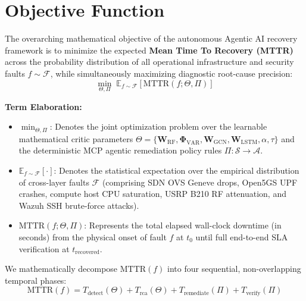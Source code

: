 \section{Objective Function}
The overarching mathematical objective of the autonomous Agentic AI recovery framework is to minimize the expected \textbf{Mean Time To Recovery (MTTR)} across the probability distribution of all operational infrastructure and security faults $f \sim \mathcal{F}$, while simultaneously maximizing diagnostic root-cause precision:
\begin{equation}
\min_{\Theta, \Pi} \; \mathbb{E}_{f \sim \mathcal{F}} \left[ \text{MTTR}(f; \Theta, \Pi) \right]
\label{eq:obj_main}
\end{equation}

\noindent\textbf{Term Elaboration:}
\begin{itemize}
    \item $\min_{\Theta, \Pi}$: Denotes the joint optimization problem over the learnable mathematical critic parameters $\Theta = \{ \mathbf{W}_{\text{RF}}, \mathbf{\Phi}_{\text{VAR}}, \mathbf{W}_{\text{GCN}}, \mathbf{W}_{\text{LSTM}}, \alpha, \tau \}$ and the deterministic MCP agentic remediation policy rules $\Pi : \mathcal{S} \to \mathcal{A}$.
    \item $\mathbb{E}_{f \sim \mathcal{F}}[\cdot]$: Denotes the statistical expectation over the empirical distribution of cross-layer faults $\mathcal{F}$ (comprising SDN OVS Geneve drops, Open5GS UPF crashes, compute host CPU saturation, USRP B210 RF attenuation, and Wazuh SSH brute-force attacks).
    \item $\text{MTTR}(f; \Theta, \Pi)$: Represents the total elapsed wall-clock downtime (in seconds) from the physical onset of fault $f$ at $t_0$ until full end-to-end SLA verification at $t_{\text{recovered}}$.
\end{itemize}

We mathematically decompose $\text{MTTR}(f)$ into four sequential, non-overlapping temporal phases:
\begin{equation}
\text{MTTR}(f) = T_{\text{detect}}(\Theta) + T_{\text{rca}}(\Theta) + T_{\text{remediate}}(\Pi) + T_{\text{verify}}(\Pi)
\label{eq:mttr_decomp}
\end{equation}

